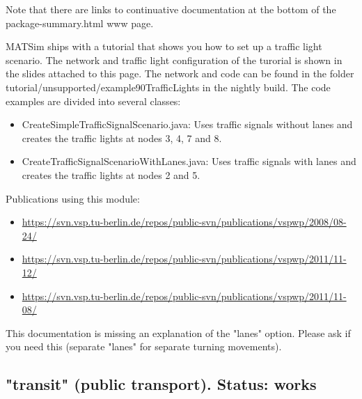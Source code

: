 Note that there are links to continuative documentation at the bottom of the package-summary.html www page.

MATSim ships with a tutorial that shows you how to set up a traffic  light scenario. The network and traffic light configuration of the  turorial is shown in the slides attached to this page. The network and  code can be found in the folder  tutorial/unsupported/example90TrafficLights in the nightly build. The  code examples are divided into several classes:
\begin{itemize}
	\item CreateSimpleTrafficSignalScenario.java: Uses traffic signals  without lanes and creates the traffic lights at nodes 3, 4, 7 and 8.
	\item CreateTrafficSignalScenarioWithLanes.java: Uses traffic signals with lanes and creates the traffic lights at nodes 2 and 5.
\end{itemize}



Publications using this module:
\begin{itemize}
	\item \href{https://svn.vsp.tu-berlin.de/repos/public-svn/publications/vspwp/2008/08-24/}{https://svn.vsp.tu-berlin.de/repos/public-svn/publications/vspwp/2008/08-24/}
	\item \href{https://svn.vsp.tu-berlin.de/repos/public-svn/publications/vspwp/2011/11-12/}{https://svn.vsp.tu-berlin.de/repos/public-svn/publications/vspwp/2011/11-12/}
	\item \href{https://svn.vsp.tu-berlin.de/repos/public-svn/publications/vspwp/2011/11-08/}{https://svn.vsp.tu-berlin.de/repos/public-svn/publications/vspwp/2011/11-08/}
\end{itemize}This documentation is missing an  explanation of the "lanes" option. Please ask if you need this  (separate "lanes" for separate turning movements).




\vfill\eject
\subsection{"transit" (public transport).  Status: works}

